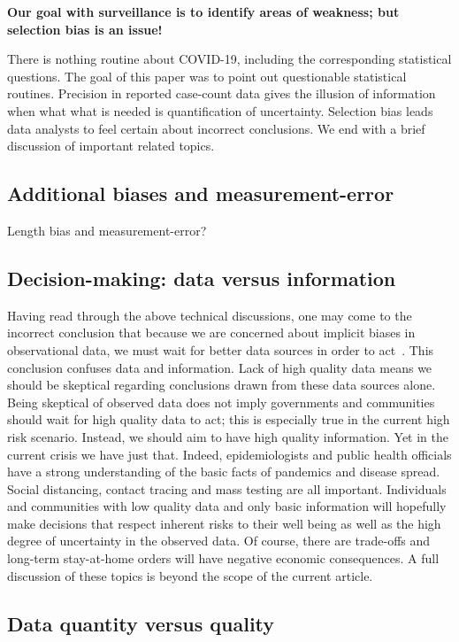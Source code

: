 \documentclass[12pt]{amsart}
\numberwithin{equation}{section}
\theoremstyle{plain}
\begin{document}
{\bf Our goal with surveillance is to identify areas of weakness; but selection bias is an issue!}

There is nothing routine about COVID-19, including the corresponding statistical questions.  The goal of this paper was to point out questionable statistical routines.  Precision in reported case-count data gives the illusion of information when what what is needed is quantification of uncertainty. Selection bias leads data analysts to feel certain about incorrect conclusions.  We end with a brief discussion of important related topics.

\subsection*{Additional biases and measurement-error}

Length bias and measurement-error?

\subsection*{Decision-making: data versus information}

Having read through the above technical discussions, one may come to the incorrect conclusion that because we are concerned about implicit biases in observational data, we must wait for better data sources in order to act~\citep{Ioannidis2020}.  This conclusion confuses data and information.  Lack of high quality data means we should be skeptical regarding conclusions drawn from these data sources alone.  Being skeptical of observed data does not imply governments and communities should wait for high quality data to act; this is especially true in the current high risk scenario.  Instead, we should aim to have high quality information.  Yet in the current crisis we have just that.  Indeed, epidemiologists and public health officials have a strong understanding of the basic facts of pandemics and disease spread.  Social distancing, contact tracing and mass testing are all important.  Individuals and communities with low quality data and only basic information will hopefully make decisions that respect inherent risks to their well being as well as the high degree of uncertainty in the observed data. Of course, there are trade-offs and long-term stay-at-home orders will have negative economic consequences.  A full discussion of these topics is beyond the scope of the current article.

\subsection*{Data quantity versus quality}
\end{document}
